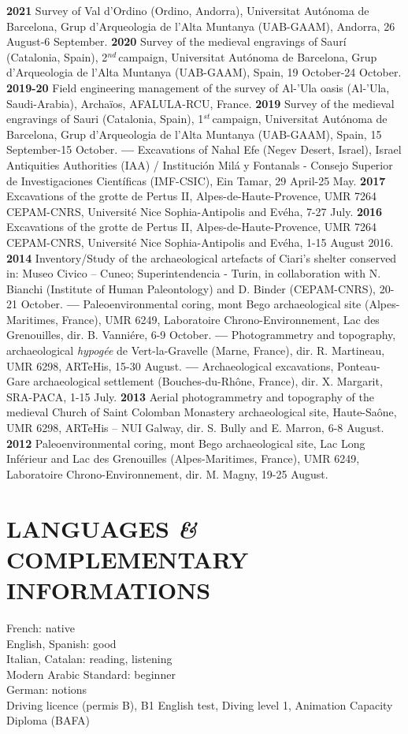 \documentclass{article}
\begin{document}
\textbf{2021 }Survey of Val d'Ordino (Ordino, Andorra), Universitat Aut\'{o}noma de Barcelona, Grup d'Arqueologia de l'Alta Muntanya (UAB-GAAM), Andorra, 26 August-6 September.
\smallbreak
\textbf{2020 }Survey of the medieval engravings of Saur\'i (Catalonia, Spain), 2${}^{nd\ }$campaign, Universitat Aut\'{o}noma de Barcelona, Grup d'Arqueologia de l'Alta Muntanya (UAB-GAAM), Spain, 19 October-24 October.
\smallbreak
\textbf{2019-20 }Field engineering management of the survey of Al-'Ula oasis (Al-'Ula, Saudi-Arabia), Archa\"{i}os, AFALULA-RCU, France.
\smallbreak
\textbf{2019 }Survey of the medieval engravings of Sauri (Catalonia, Spain), 1${}^{st\ }$campaign, Universitat Aut\'{o}noma de Barcelona, Grup d'Arqueologia de l'Alta Muntanya (UAB-GAAM), Spain, 15 September-15 October.
\smallbreak
\textbf{--- }Excavations of Nahal Efe (Negev Desert, Israel), Israel Antiquities Authorities (IAA) / Instituci\'{o}n Mil\'{a} y Fontanals - Consejo Superior de Investigaciones Cient\'{i}ficas (IMF-CSIC), Ein Tamar, 29 April-25 May.
\smallbreak
\textbf{2017 }Excavations of the grotte de Pertus II, Alpes-de-Haute-Provence, UMR 7264 CEPAM-CNRS, Universit\'{e} Nice Sophia-Antipolis and Ev\'{e}ha, 7-27 July.
\smallbreak
\textbf{2016 }Excavations of the grotte de Pertus II, Alpes-de-Haute-Provence, UMR 7264 CEPAM-CNRS, Universit\'{e} Nice Sophia-Antipolis and Ev\'{e}ha, 1-15 August 2016.
\smallbreak
\textbf{2014 }Inventory/Study of the archaeological artefacts of Ciari's shelter conserved in: Museo Civico -- Cuneo; Superintendencia - Turin, in collaboration with N. Bianchi (Institute of Human Paleontology) and D. Binder (CEPAM-CNRS), 20-21 October.
\smallbreak
\textbf{--- }Paleoenvironmental coring, mont Bego archaeological site (Alpes-Maritimes, France), UMR 6249, Laboratoire Chrono-Environnement, Lac des Grenouilles, dir. B. Vanni\'{e}re, 6-9 October.
\smallbreak
\textbf{--- }Photogrammetry and topography, archaeological \textit{hypog\'{e}e} de Vert-la-Gravelle (Marne, France), dir. R. Martineau, UMR 6298, ARTeHis, 15-30 August.
\smallbreak
\textbf{--- }Archaeological excavations, Ponteau-Gare archaeological settlement (Bouches-du-Rh\^{o}ne, France), dir. X. Margarit, SRA-PACA, 1-15 July.\smallbreak
\textbf{2013 }Aerial\textbf{ }photogrammetry and topography of the medieval Church of Saint Colomban Monastery archaeological site, Haute-Sa\^{o}ne, UMR 6298, ARTeHis -- NUI Galway, dir. S. Bully and E. Marron, 6-8 August.
\smallbreak
\textbf{2012 }Paleoenvironmental coring, mont Bego archaeological site, Lac Long Inf\'{e}rieur and Lac des Grenouilles (Alpes-Maritimes, France), UMR 6249, Laboratoire Chrono-Environnement, dir. M. Magny, 19-25 August.

\section*{LANGUAGES \textit{\&} COMPLEMENTARY INFORMATIONS}

French: native \\
English, Spanish: good \\
Italian, Catalan: reading, listening \\
Modern Arabic Standard: beginner \\
German: notions \\

Driving licence (permis B), B1 English test, Diving level 1, Animation Capacity Diploma (BAFA)
\end{document}
